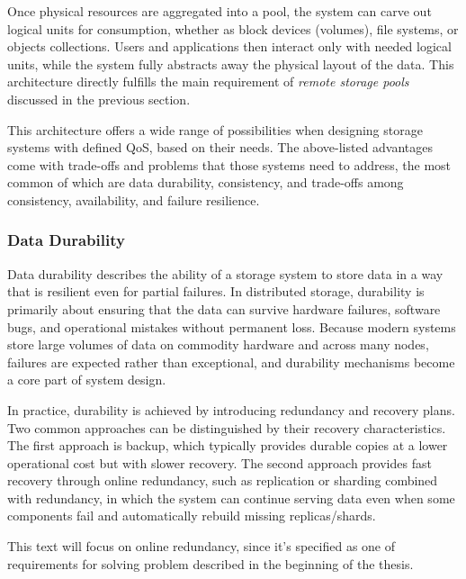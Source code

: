 Once physical resources are aggregated into a pool, the system can carve out logical units for consumption, whether as block devices (volumes), file systems, or objects collections. Users and applications then interact only with needed logical units, while the system fully abstracts away the physical layout of the data. This architecture directly fulfills the main requirement of \emph{remote storage pools} discussed in the previous section. \cite{macedo_survey_2021, moucha_software_2021}

This architecture offers a wide range of possibilities when designing storage systems with defined QoS, based on their needs. The above-listed advantages come with trade-offs and problems that those systems need to address, the most common of which are data durability, consistency, and trade-offs among consistency, availability, and failure resilience.


\subsubsection{Data Durability}
Data durability describes the ability of a storage system to store data in a way that is resilient even for partial failures. In distributed storage, durability is primarily about ensuring that the data can survive hardware failures, software bugs, and operational mistakes without permanent loss. Because modern systems store large volumes of data on commodity hardware and across many nodes, failures are expected rather than exceptional, and durability mechanisms become a core part of system design.

In practice, durability is achieved by introducing redundancy and recovery plans. Two common approaches can be distinguished by their recovery characteristics. The first approach is backup, which typically provides durable copies at a lower operational cost but with slower recovery. The second approach provides fast recovery through online redundancy, such as replication or sharding combined with redundancy, in which the system can continue serving data even when some components fail and automatically rebuild missing replicas/shards.

This text will focus on online redundancy, since it's specified as one of requirements for solving problem described in the beginning of the thesis.  
